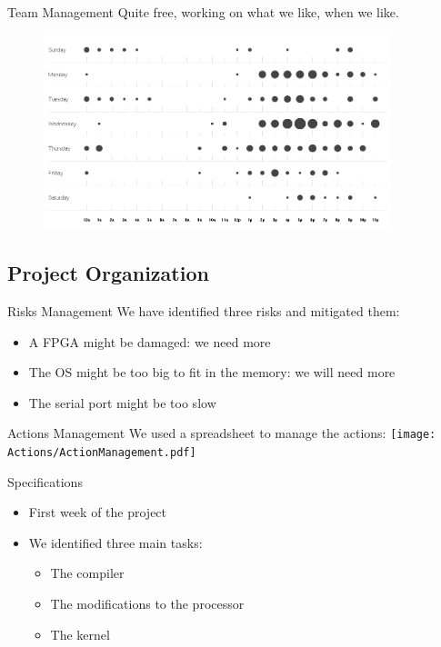 \documentclass{beamer}
\begin{document}
      \begin{frame}{Team Management}
        Quite free, working on what we like, when we like.

        \pause
        \begin{figure}
          \centering
          \includegraphics[width=0.9\textwidth]{fig/punchcard.png}
        \end{figure}
      \end{frame}

    \subsection{Project Organization}
      \begin{frame}{Risks Management}
        We have identified three risks and mitigated them:
        \begin{itemize}
          \item A FPGA might be damaged: we need more
          \item The OS might be too big to fit in the memory: we will need more
          \item The serial port might be too slow
        \end{itemize}
      \end{frame}

      \begin{frame}{Actions Management}
        We used a spreadsheet to manage the actions:
          \texttt{[image: Actions/ActionManagement.pdf]}
      \end{frame}

      \begin{frame}{Specifications}
        \begin{itemize}
          \item First week of the project
          \item We identified three main tasks:
            \begin{itemize}
              \item The compiler
              \item The modifications to the processor
              \item The kernel
            \end{itemize}
          \end{itemize}
      \end{frame}
\end{document}
